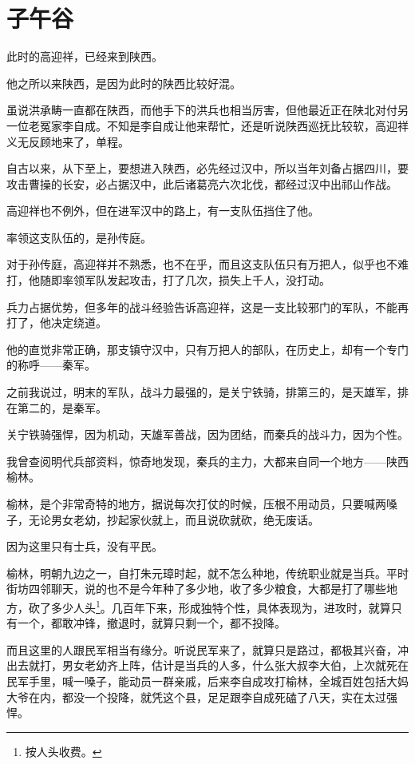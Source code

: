 \section{子午谷}
\ifnum{}
	\begin{multicols}{\theparacolNo}
		\fi
		此时的高迎祥，已经来到陕西。

		他之所以来陕西，是因为此时的陕西比较好混。

		虽说洪承畴一直都在陕西，而他手下的洪兵也相当厉害，但他最近正在陕北对付另一位老冤家李自成。不知是李自成让他来帮忙，还是听说陕西巡抚比较软，高迎祥义无反顾地来了，单程。

		自古以来，从下至上，要想进入陕西，必先经过汉中，所以当年刘备占据四川，要攻击曹操的长安，必占据汉中，此后诸葛亮六次北伐，都经过汉中出祁山作战。

		高迎祥也不例外，但在进军汉中的路上，有一支队伍挡住了他。

		率领这支队伍的，是孙传庭。

		对于孙传庭，高迎祥并不熟悉，也不在乎，而且这支队伍只有万把人，似乎也不难打，他随即率领军队发起攻击，打了几次，损失上千人，没打动。

		兵力占据优势，但多年的战斗经验告诉高迎祥，这是一支比较邪门的军队，不能再打了，他决定绕道。

		他的直觉非常正确，那支镇守汉中，只有万把人的部队，在历史上，却有一个专门的称呼——秦军。

		之前我说过，明末的军队，战斗力最强的，是关宁铁骑，排第三的，是天雄军，排在第二的，是秦军。

		关宁铁骑强悍，因为机动，天雄军善战，因为团结，而秦兵的战斗力，因为个性。

		我曾查阅明代兵部资料，惊奇地发现，秦兵的主力，大都来自同一个地方——陕西榆林。

		榆林，是个非常奇特的地方，据说每次打仗的时候，压根不用动员，只要喊两嗓子，无论男女老幼，抄起家伙就上，而且说砍就砍，绝无废话。

		因为这里只有士兵，没有平民。

		榆林，明朝九边之一，自打朱元璋时起，就不怎么种地，传统职业就是当兵。平时街坊四邻聊天，说的也不是今年种了多少地，收了多少粮食，大都是打了哪些地方，砍了多少人头\footnote{按人头收费。}。几百年下来，形成独特个性，具体表现为，进攻时，就算只有一个，都敢冲锋，撤退时，就算只剩一个，都不投降。

		而且这里的人跟民军相当有缘分。听说民军来了，就算只是路过，都极其兴奋，冲出去就打，男女老幼齐上阵，估计是当兵的人多，什么张大叔李大伯，上次就死在民军手里，喊一嗓子，能动员一群亲戚，后来李自成攻打榆林，全城百姓包括大妈大爷在内，都没一个投降，就凭这个县，足足跟李自成死磕了八天，实在太过强悍。


\end{multicols}
